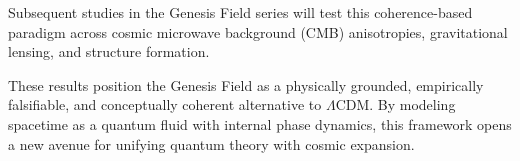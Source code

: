 Subsequent studies in the Genesis Field series will test this coherence-based paradigm across cosmic microwave background (CMB) anisotropies, gravitational lensing, and structure formation.

These results position the Genesis Field as a physically grounded, empirically falsifiable, and conceptually coherent alternative to \(\Lambda\)CDM. By modeling spacetime as a quantum fluid with internal phase dynamics, this framework opens a new avenue for unifying quantum theory with cosmic expansion.
